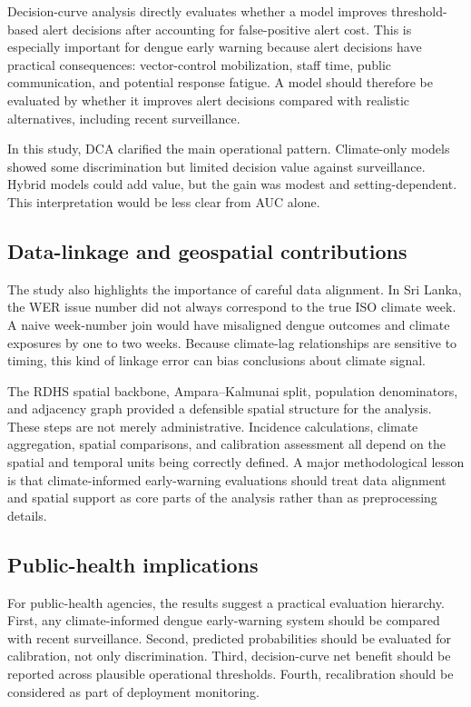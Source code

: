 \documentclass[11pt,a4paper]{article}
\begin{document}
Decision-curve analysis directly evaluates whether a model improves threshold-based alert decisions after accounting for false-positive alert cost. This is especially important for dengue early warning because alert decisions have practical consequences: vector-control mobilization, staff time, public communication, and potential response fatigue. A model should therefore be evaluated by whether it improves alert decisions compared with realistic alternatives, including recent surveillance.

In this study, DCA clarified the main operational pattern. Climate-only models showed some discrimination but limited decision value against surveillance. Hybrid models could add value, but the gain was modest and setting-dependent. This interpretation would be less clear from AUC alone.

\subsection{Data-linkage and geospatial contributions}
\label{subsec:data-linkage-discussion}

The study also highlights the importance of careful data alignment. In Sri Lanka, the WER issue number did not always correspond to the true ISO climate week. A naive week-number join would have misaligned dengue outcomes and climate exposures by one to two weeks. Because climate-lag relationships are sensitive to timing, this kind of linkage error can bias conclusions about climate signal.

The RDHS spatial backbone, Ampara--Kalmunai split, population denominators, and adjacency graph provided a defensible spatial structure for the analysis. These steps are not merely administrative. Incidence calculations, climate aggregation, spatial comparisons, and calibration assessment all depend on the spatial and temporal units being correctly defined. A major methodological lesson is that climate-informed early-warning evaluations should treat data alignment and spatial support as core parts of the analysis rather than as preprocessing details.

\subsection{Public-health implications}
\label{subsec:public-health-implications}

For public-health agencies, the results suggest a practical evaluation hierarchy. First, any climate-informed dengue early-warning system should be compared with recent surveillance. Second, predicted probabilities should be evaluated for calibration, not only discrimination. Third, decision-curve net benefit should be reported across plausible operational thresholds. Fourth, recalibration should be considered as part of deployment monitoring.
\end{document}
